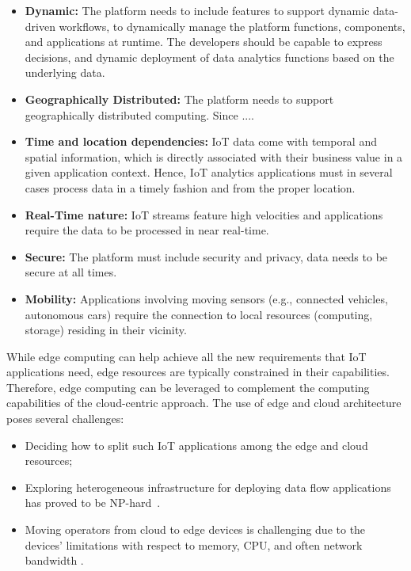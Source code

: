 \begin{itemize}

\item{\textbf{Dynamic:}} The platform needs to include features to support dynamic data-driven workflows, to dynamically manage the platform functions, components, and applications at runtime. The developers should be capable to express decisions, and dynamic deployment of data analytics functions based on the underlying data.

\item{\textbf{Geographically Distributed:}} The platform needs to support geographically distributed computing. Since ....

\item{\textbf{Time and location dependencies:}} IoT data come with temporal and spatial information, which is directly associated with their business value in a given application context. Hence, IoT analytics applications must in several cases process data in a timely fashion and from the proper location.

\item{\textbf{Real-Time nature:}} IoT streams feature high velocities and applications require the data to be processed in near real-time. 

\item{\textbf{Secure:}} The platform must include security and privacy, data needs to be secure at all times.

\item{\textbf{Mobility:}} Applications involving moving sensors (e.g., connected vehicles, autonomous cars) require the connection to local resources (computing, storage) residing in their vicinity. 

\end{itemize}

While edge computing can help achieve all the new requirements that IoT applications need, edge resources are typically constrained in their capabilities. Therefore, edge computing can be leveraged to complement the computing capabilities of the cloud-centric approach. The use of edge and cloud architecture poses several challenges: 

\begin{itemize}
\item Deciding how to split such IoT applications among the edge and cloud resources;

\item Exploring heterogeneous infrastructure for deploying data flow applications has proved to be NP-hard~\cite{Benoit:2013}.
 
\item Moving operators from cloud to edge devices is challenging due to the devices' limitations with respect to memory, CPU, and often network bandwidth \cite{dias:2018:survey}.
\end{itemize}

